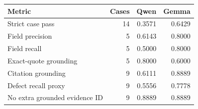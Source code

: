 \begin{tabularx}{\linewidth}{Xrrr}
\toprule
Metric & Cases & Qwen & Gemma \\
\midrule
Strict case pass & 14 & 0.3571 & 0.6429 \\
Field precision & 5 & 0.6143 & 0.8000 \\
Field recall & 5 & 0.5000 & 0.8000 \\
Exact-quote grounding & 5 & 0.8000 & 0.6000 \\
Citation grounding & 9 & 0.6111 & 0.8889 \\
Defect recall proxy & 9 & 0.5556 & 0.7778 \\
No extra grounded evidence ID & 9 & 0.8889 & 0.8889 \\
\bottomrule
\end{tabularx}
